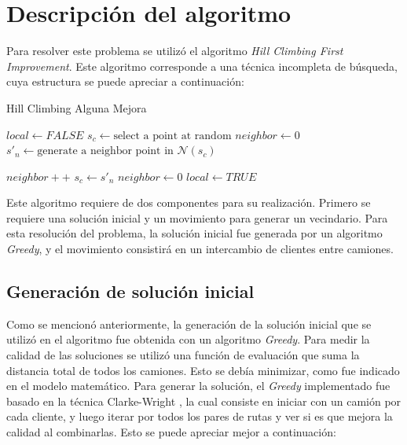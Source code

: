 \documentclass{article}
\begin{document}
\section{Descripci\'on del algoritmo}
Para resolver este problema se utilizó el algoritmo \textit{Hill Climbing First Improvement}. Este algoritmo corresponde a una técnica incompleta de búsqueda, cuya estructura se puede apreciar a continuación:
\begin{algorithm}
    \caption{Hill Climbing Alguna Mejora}\label{alg:cap}
    \begin{algorithmic}
        \State $local \gets FALSE$
        \State $s_c \gets \text{select a point at random}$
        \State $neighbor \gets 0$
        \Repeat
        \State $s'_n \gets \text{generate a neighbor point in } \mathscr{N}(s_c)$
        
        $neighbor++$
            \State $s_c \gets s'_n$
            \State $neighbor \gets 0$
        \EndIf
            \State $local \gets TRUE$
        \EndIf
    \end{algorithmic}
\end{algorithm}

Este algoritmo requiere de dos componentes para su realización. Primero se requiere una solución inicial y un movimiento para generar un vecindario. Para esta resolución del problema, la solución inicial fue generada por un algoritmo \textit{Greedy}, y el movimiento consistirá en un intercambio de clientes entre camiones.

\subsection{Generación de solución inicial}
Como se mencionó anteriormente, la generación de la solución inicial que se utilizó en el algoritmo fue obtenida con un algoritmo \textit{Greedy}. Para medir la calidad de las soluciones se utilizó una función de evaluación que suma la distancia total de todos los camiones. Esto se debía minimizar, como fue indicado en el modelo matemático. Para generar la solución, el \textit{Greedy} implementado fue basado en la técnica Clarke-Wright \cite{clarke1964scheduling}, la cual consiste en iniciar con un camión por cada cliente, y luego iterar por todos los pares de rutas y ver si es que mejora la calidad al combinarlas. Esto se puede apreciar mejor a continuación:
\end{document}

